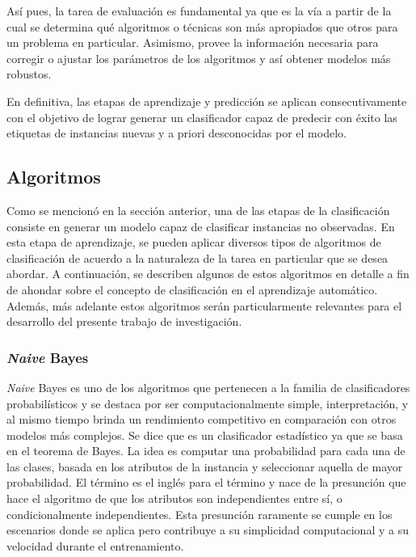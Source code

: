 Así pues, la tarea de evaluación es fundamental ya que es la vía a partir de la
cual se determina qué algoritmos o técnicas son más apropiados que otros para un
problema en particular. Asimismo, provee la información necesaria para corregir
o ajustar los parámetros de los algoritmos y así obtener modelos más robustos. 

En definitiva, las etapas de aprendizaje y predicción se aplican
consecutivamente con el objetivo de lograr generar un clasificador capaz de
predecir con éxito las etiquetas de instancias nuevas y a priori desconocidas
por el modelo.

\subsection{Algoritmos}
\label{clasificacion_algoritmos}

Como se mencionó en la sección anterior, una de las etapas de la clasificación
consiste en generar un modelo capaz de clasificar instancias no observadas. En
esta etapa de aprendizaje, se pueden aplicar diversos tipos de algoritmos de
clasificación de acuerdo a la naturaleza de la tarea en particular que se desea
abordar. A continuación, se describen algunos de estos algoritmos en detalle a
fin de ahondar sobre el concepto de clasificación en el aprendizaje automático.
Además, más adelante estos algoritmos serán particularmente relevantes para el
desarrollo del presente trabajo de investigación.

\subsubsection{\textit{Naive} Bayes}

\textit{Naive} Bayes es uno de los algoritmos que pertenecen a la familia de
clasificadores probabilísticos y se destaca por ser computacionalmente simple,
interpretación, y al mismo tiempo brinda un  rendimiento competitivo en
comparación con otros modelos más complejos. Se dice que es un clasificador
estadístico ya que se basa en el teorema de Bayes. La idea es computar una
probabilidad para cada una de las clases, basada en los atributos de la
instancia y seleccionar aquella de mayor probabilidad. El término
 es el inglés para el término
 y nace de la presunción que hace el algoritmo de que
los atributos son independientes entre sí, o condicionalmente independientes.
Esta presunción raramente se cumple en los escenarios donde se aplica pero
contribuye a su simplicidad computacional y a su velocidad durante el
entrenamiento.


